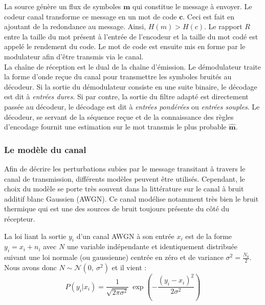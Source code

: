 La source génère un flux de symboles $\mathbf{m}$ qui constitue le message à envoyer. Le codeur canal transforme ce message 
en un mot de code $\mathbf{c}$. Ceci est fait en ajoutant de la redondance au message. Ainsi, $H(m)>H(c)$. Le rapport $R$
entre la taille du mot présent à l'entrée de l'encodeur et la taille du mot codé est appelé le rendement du code. Le mot 
de code est ensuite mis en forme par le modulateur afin d'être transmis via le canal.\\
La chaîne de réception est le dual de la chaîne d’émission. Le démodulateur traite la forme d'onde reçue du canal 
pour transmettre les symboles bruités au décodeur. Si la sortie du démodulateur consiste en une suite binaire, le 
décodage est dit à \emph{entrées dures}. Si par contre, la sortie du filtre adapté est directement passée au décodeur, 
le décodage est dit à \emph{entrées pondérées} ou \emph{entrées souples}. Le décodeur, se servant de la séquence reçue et de la connaissance des règles 
d'encodage fournit une estimation sur le  mot transmis le plus probable $\mathbf{\hat{m}}$.


\subsubsection{Le modèle du canal}\label{ss:cod_canal}
Afin de décrire les perturbations subies par le message transitant à travers le canal de transmission, différents modèles 
peuvent être utilisés. 
Cependant, le choix du modèle se porte très souvent dans la littérature sur le canal à bruit additif blanc Gaussien 
(AWGN). 
Ce canal modélise notamment très bien le bruit thermique qui est une des sources de bruit toujours présente du côté du récepteur.

La loi liant la sortie $y_i$ d'un canal AWGN à son entrée $x_i$ est de la forme $y_i=x_i+n_i$ avec $N$ une variable 
indépendante et identiquement distribuée suivant une loi normale (ou gaussienne) centrée en zéro et de variance $\sigma^2 = \frac{N_0}{2}$. Nous avons donc
$N \sim \mathcal{N}(0,\ \sigma^2)$ et il vient :
\begin{equation}
	\label{eq:p(y|x)}
	P(y_i|x_i) = \frac{1}{\sqrt{2\pi \sigma^2}}~\exp\left(-{\frac{(y_i-x_i)^2}{2\sigma^2}}\right)
\end{equation}

